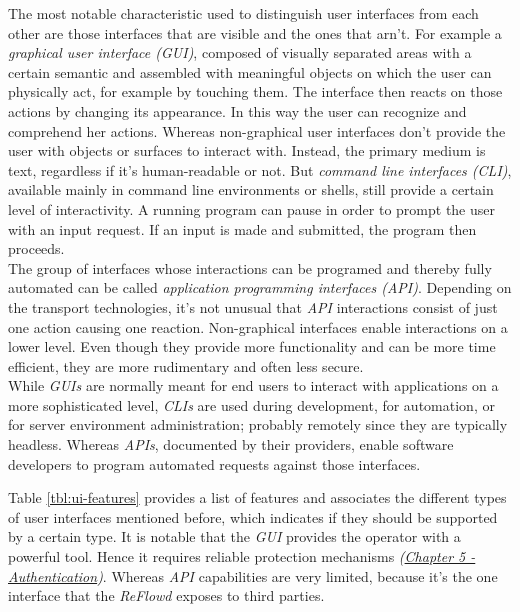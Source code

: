 \documentclass[12pt,english,a4paper,titlepage,cleardoublepage=empty,dottedtoc]{report}
\begin{document}
The most notable characteristic used to distinguish user interfaces from
each other are those interfaces that are visible and the ones that
arn't. For example a \emph{graphical user interface (GUI)}, composed of
visually separated areas with a certain semantic and assembled with
meaningful objects on which the user can physically act, for example by
touching them. The interface then reacts on those actions by changing
its appearance. In this way the user can recognize and comprehend her
actions. Whereas non-graphical user interfaces don't provide the user
with objects or surfaces to interact with. Instead, the primary medium
is text, regardless if it's human-readable or not. But \emph{command
line interfaces (CLI)}, available mainly in command line environments or
shells, still provide a certain level of interactivity. A running
program can pause in order to prompt the user with an input request. If
an input is made and submitted, the program then proceeds.\\
The group of interfaces whose interactions can be programed and thereby
fully automated can be called \emph{application programming interfaces
(API)}. Depending on the transport technologies, it's not unusual that
\emph{API} interactions consist of just one action causing one reaction.
Non-graphical interfaces enable interactions on a lower level. Even
though they provide more functionality and can be more time efficient,
they are more rudimentary and often less secure.\\
While \emph{GUIs} are normally meant for end users to interact with
applications on a more sophisticated level, \emph{CLIs} are used during
development, for automation, or for server environment administration;
probably remotely since they are typically headless. Whereas
\emph{APIs}, documented by their providers, enable software developers
to program automated requests against those interfaces.

Table \ref{tbl:ui-features} provides a list of features and associates
the different types of user interfaces mentioned before, which indicates
if they should be supported by a certain type. It is notable that the
\emph{GUI} provides the operator with a powerful tool. Hence it requires
reliable protection mechanisms
\emph{(\protect\hyperlink{authentication}{Chapter 5 - Authentication})}.
Whereas \emph{API} capabilities are very limited, because it's the one
interface that the \emph{ReFlowd} exposes to third parties.
\end{document}
